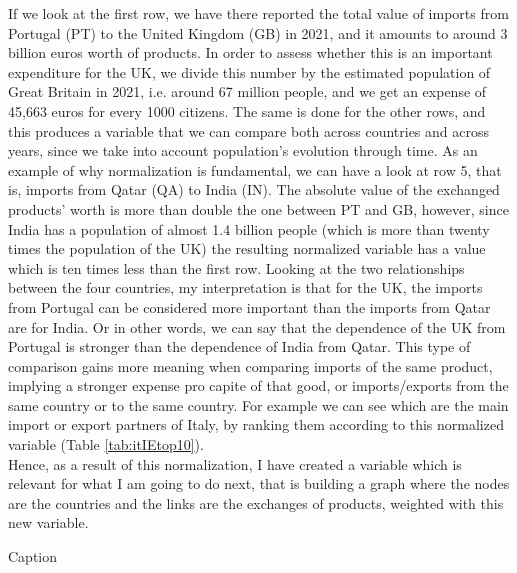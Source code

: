 If we look at the first row, we have there reported the total value of imports from Portugal (PT) to the United Kingdom (GB) in 2021, and it amounts to around 3 billion euros worth of products. In order to assess whether this is an important expenditure for the UK, we divide this number by the estimated population of Great Britain in 2021, i.e. around 67 million people, and we get an expense of 45,663 euros for every 1000 citizens. The same is done for the other rows, and this produces a variable that we can compare both across countries and across years, since we take into account population's evolution through time. As an example of why normalization is fundamental, we can have a look at row 5, that is, imports from Qatar (QA) to India (IN). The absolute value of the exchanged products' worth is more than double the one between PT and GB, however, since India has a population of almost 1.4 billion people (which is more than twenty times the population of the UK) the resulting normalized variable has a value which is ten times less than the first row. Looking at the two relationships between the four countries, my interpretation is that for the UK, the imports from Portugal can be considered more important than the imports from Qatar are for India. Or in other words, we can say that the dependence of the UK from Portugal is stronger than the dependence of India from Qatar. This type of comparison gains more meaning when comparing imports of the same product, implying a stronger expense pro capite of that good, or imports/exports from the same country or to the same country. For example we can see which are the main import or export partners of Italy, by ranking them according to this normalized variable (Table \ref{tab:itIEtop10}).\\
Hence, as a result of this normalization, I have created a variable which is relevant for what I am going to do next, that is building a graph where the nodes are the countries and the links are the exchanges of products, weighted with this new variable.

\begin{table}
    \centering
    \resizebox{1.0\textwidth}{!}{
    
    }
    \caption{Caption}
    \label{tab:itIEtop10}
\end{table}



